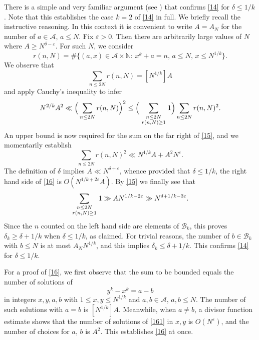 \documentclass[reqno]{amsart}
\newcommand{\multsum}[2]{\sum_{{\scriptstyle #1}\atop {\scriptstyle #2}}}
\numberwithin{equation}{section}
\begin{document}
There is a simple and very familiar argument (see \cite[Theorem 6.2]{hlm}) that confirms \eqref{14} for $\delta\le 1/k$. Note that this establishes the case $k=2$ of \eqref{14} in full. We briefly recall the instructive reasoning. In this context it is convenient to write $A=A_N$ for the number of $a\in\mathscr A$, $a\le N$. Fix $\varepsilon>0$. Then there are arbitrarily large values of $N$ where $A\ge N^{\delta-\varepsilon}$. For such $N$, we  consider
$$ r(n,N) = \# \{(a,x)\in\mathscr A\times \mathbb N:\, x^k+a=n,\, a\le N,\, x\le N^{1/k}\}. $$
We observe that
$$ \sum_{n\le 2N} r(n,N) = [N^{1/k}]A $$
and apply  Cauchy's inequality to infer
\begin{equation}\label{15} N^{2/k}A^2 \ll \Big(\sum_{n\le 2N} r(n,N)\Big)^2 \le \Big(\multsum{n\le 2N}{r(n,N)\ge 1} 1 \Big) \sum_{n\le 2N} r(n,N)^2. \end{equation}
An upper bound is now required for the sum on the far right of \eqref{15}, and we momentarily establish 
\begin{equation}\label{16} \sum_{n\le 2N} r(n,N)^2 \ll N^{1/k}A + A^2N^\varepsilon. \end{equation}
The definition of $\delta$ implies $A\ll N^{\delta+\varepsilon}$, whence provided that $\delta\le 1/k$, the right hand side of \eqref{16} is $O(N^{1/k + 2\varepsilon}A) $. By \eqref{15} we finally see that
$$ \multsum{n\le 2N}{r(n,N)\ge 1} 1\gg AN^{1/k-2\varepsilon} \gg N^{\delta+1/k-3\varepsilon}.  $$
Since the $n$ counted on the left hand side are elements of $\mathscr B_k$, this proves $\delta_k\ge \delta + 1/k$  when $\delta\le 1/k$, as claimed. For trivial reasons, the number of $b\in\mathscr B_k$ with $b\le N$ is at most $A_N  N^{1/k}$, and this implies 
$\delta_k\le \delta + 1/k$. This confirms \eqref{14} for $\delta\le 1/k$.



For a proof of \eqref{16}, we first observe that the sum to be bounded equals the number of solutions of 
\begin{equation}\label{161} y^k - x^k = a-b  \end{equation}
in integers $x,y,a,b$ with $1\le x,y\le N^{1/k}$ and $a,b\in\mathscr A$, $a,b\le N$. The number of such solutions with $a=b$ is $[N^{1/k}]A$. Meanwhile, when $a\neq b$, a divisor function estimate shows that the number of solutions of \eqref{161} in $x,y$ is $O(N^\varepsilon)$, and the number of choices for $a$, $b$ is $A^2$. This establishes \eqref{16} at once.
\end{document}
